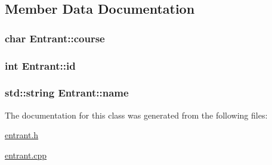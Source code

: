 \subsection{\-Member \-Data \-Documentation}
\hypertarget{classEntrant_a6a07700d22efca127fb9fe9da2f6e8a6}{
\subsubsection[{course}]{\setlength{\rightskip}{0pt plus 5cm}char {\bf \-Entrant\-::course}}}\label{classEntrant_a6a07700d22efca127fb9fe9da2f6e8a6}
\hypertarget{classEntrant_a38e44f4d077b9570ce24e9bdcb5cd002}{
\subsubsection[{id}]{\setlength{\rightskip}{0pt plus 5cm}int {\bf \-Entrant\-::id}}}\label{classEntrant_a38e44f4d077b9570ce24e9bdcb5cd002}
\hypertarget{classEntrant_a1f90de1d03c5bf4fb5bf4fac2d437129}{
\subsubsection[{name}]{\setlength{\rightskip}{0pt plus 5cm}std\-::string {\bf \-Entrant\-::name}}}\label{classEntrant_a1f90de1d03c5bf4fb5bf4fac2d437129}


\-The documentation for this class was generated from the following files\-:\begin{DoxyCompactItemize}
\item 
\hyperlink{entrant_8h}{entrant.\-h}\item 
\hyperlink{entrant_8cpp}{entrant.\-cpp}\end{DoxyCompactItemize}
